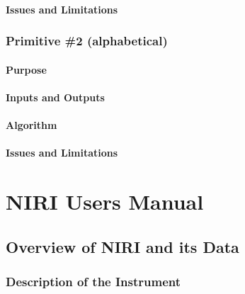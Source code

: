 \documentclass[letterpaper,10pt,english]{sphinxmanual}
\begin{document}
\subsubsection{Issues and Limitations}
\label{NIFS/primitives_pages/primitive1:issues-and-limitations}

\subsection{Primitive \#2  (alphabetical)}
\label{NIFS/primitives_pages/primitive2:primitive-2-alphabetical}\label{NIFS/primitives_pages/primitive2:nifs-primitive-2}\label{NIFS/primitives_pages/primitive2::doc}

\subsubsection{Purpose}
\label{NIFS/primitives_pages/primitive2:purpose}

\subsubsection{Inputs and Outputs}
\label{NIFS/primitives_pages/primitive2:inputs-and-outputs}

\subsubsection{Algorithm}
\label{NIFS/primitives_pages/primitive2:algorithm}

\subsubsection{Issues and Limitations}
\label{NIFS/primitives_pages/primitive2:issues-and-limitations}

\chapter{NIRI Users Manual}
\label{NIRIcontents:niri-users-manual}\label{NIRIcontents::doc}\label{NIRIcontents:id1}

\section{Overview of NIRI and its Data}
\label{NIRI/instrument::doc}\label{NIRI/instrument:overview-of-niri-and-its-data}\label{NIRI/instrument:niri-instrument-overview}

\subsection{Description of the Instrument}
\label{NIRI/instrument:description-of-the-instrument}
\end{document}

